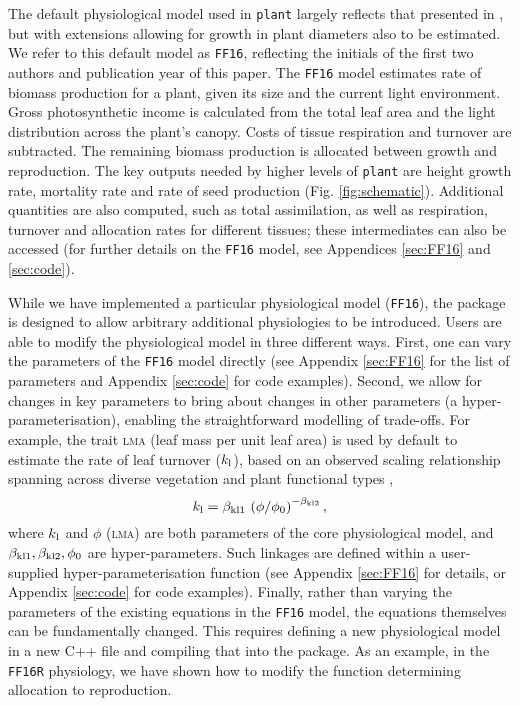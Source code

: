 \documentclass[a4paper,11pt]{article}
\newcommand{\plant}{\texttt{plant}}
\begin{document}
The default physiological model used in {\plant} largely reflects
that presented in \citet{Falster-2011, Falster-2015}, but with extensions
allowing for growth in plant diameters also to be estimated. We refer to this
default model as \texttt{FF16}, reflecting the initials of the first two authors
and publication year of this paper. The \texttt{FF16} model estimates rate
of biomass
production for a plant, given its size and the current light
environment. Gross photosynthetic income is calculated from the total
leaf area and the light distribution across the plant's canopy. Costs
of tissue respiration and turnover are subtracted. The remaining
biomass production is allocated between growth and reproduction. The key
outputs needed by higher levels of {\plant} are height
growth rate, mortality rate and rate of seed production (Fig. \ref{fig:schematic}). Additional quantities are also computed, such as total assimilation, as well as
respiration, turnover and allocation rates for different
tissues; these intermediates can also be accessed (for further details on the \texttt{FF16} model, see Appendices
\ref{sec:FF16} and \ref{sec:code}).

While we have implemented a particular physiological model
(\texttt{FF16}), the package is designed to allow arbitrary
additional physiologies to be introduced. Users are able to modify the
physiological model in three different ways. First, one can vary the
parameters of the \texttt{FF16} model directly (see Appendix
\ref{sec:FF16} for the list of parameters and Appendix \ref{sec:code} for code
examples). Second, we allow for changes in key parameters to bring
about changes in other parameters (a hyper-parameterisation), enabling the
straightforward modelling of trade-offs. For example, the
trait \textsc{lma} (leaf mass per unit leaf area) is used by default to estimate
the rate of leaf turnover ($k_{\rm l}$), based on an observed scaling
relationship spanning across diverse vegetation and plant functional
types \citep{Wright-2004},
$$k_{\rm l} = \beta_{{\rm kl}1} \, \left(\phi / \phi_0\right)^{-\beta_{{\rm kl}2}},$$
where $k_{\rm l}$ and $\phi$ (\textsc{lma}) are both parameters of the core physiological
model, and $\beta_{{\rm kl}1}, \beta_{{\rm kl}2}, \phi_0$ are hyper-parameters. Such
linkages are defined within a user-supplied hyper-parameterisation function
(see Appendix \ref{sec:FF16} for details, or Appendix
\ref{sec:code} for code examples).
%
Finally, rather than varying the parameters of the existing equations
in the \texttt{FF16} model, the equations themselves can be
fundamentally changed. This requires defining a new physiological
model in a new C++ file and compiling that into the package. As an
example, in the \texttt{FF16R} physiology, we have shown how to modify the
function determining allocation to reproduction.
\end{document}
